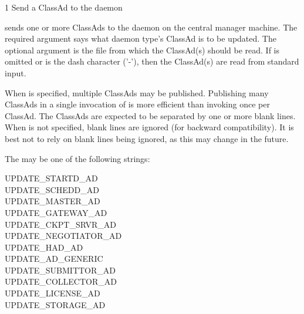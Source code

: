 \begin{ManPage}{\label{man-condor-advertise}}{1}
{Send a ClassAd to the  daemon}
\Synopsis {}
\ToolArgsBase



\Description
{} sends one or more ClassAds to the  daemon on
the central manager machine.
The required argument  says what daemon type's ClassAd
is to be updated.
The optional argument  is the file from which the
ClassAd(s) should be read.
If  is omitted or is the dash character ('-'),
then the ClassAd(s) are read from standard input.

When  is specified, multiple ClassAds may be published.
Publishing many ClassAds in a single invocation of  is
more efficient than invoking  once per ClassAd.
The ClassAds are expected to be separated by one or more blank lines.
When  is not specified, blank lines are ignored (for
backward compatibility).  
It is best not to rely on blank lines being ignored,
as this may change in the future.

The  may be one of the following strings:
\begin{description}
\item[UPDATE\_STARTD\_AD]
\item[UPDATE\_SCHEDD\_AD]
\item[UPDATE\_MASTER\_AD]
\item[UPDATE\_GATEWAY\_AD]
\item[UPDATE\_CKPT\_SRVR\_AD]
\item[UPDATE\_NEGOTIATOR\_AD]
\item[UPDATE\_HAD\_AD]
\item[UPDATE\_AD\_GENERIC]
\item[UPDATE\_SUBMITTOR\_AD]
\item[UPDATE\_COLLECTOR\_AD]
\item[UPDATE\_LICENSE\_AD]
\item[UPDATE\_STORAGE\_AD]
\end{description}


\end{ManPage}
